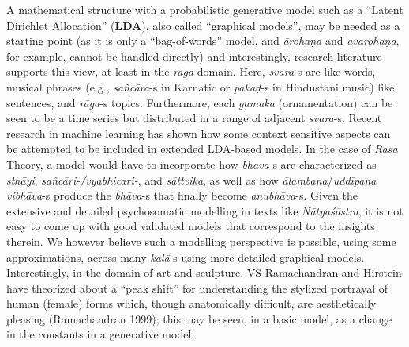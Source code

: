 A mathematical structure with a probabilistic generative model such as a “Latent Dirichlet Allocation” (\textbf{LDA}), also called “graphical models”, may be needed as a starting point (as it is only a “bag-of-words” model, and \textsl{ārohaṇa} and \textsl{avarohaṇa}, for example, cannot be handled directly) and interestingly, research literature supports this view, at least in the \textsl{rāga} domain. Here, \textsl{svara}-s are like words, musical phrases (e.g., \textsl{sañcāra}-s in Karnatic or \textsl{pakaḍ}-s in Hindustani music) like sentences, and \textsl{rāga}-s topics. Furthermore, each \textsl{gamaka} (ornamentation) can be seen to be a time series but distributed in a range of adjacent \hbox{\textsl{svara}-s}. Recent research in machine learning has shown how some context sensitive aspects can be attempted to be included in extended LDA-based models. In the case of \textsl{Rasa} Theory, a model would have to incorporate how \textsl{bhava}-s are characterized as \textsl{sthāyi}, \textsl{sañcāri-/vyabhicari-}, and \textsl{sāttvika}, as well as how \textsl{ālambana}/\textsl{uddīpana vibhāva}-s produce the \textsl{bhāva}-s that finally become \textsl{anubhāva}-s.
 Given the extensive and detailed psychosomatic modelling in texts like \textsl{Nāṭyaśāstra}, it is not easy to come up with good validated models that correspond to the insights therein. We however believe such a modelling perspective is possible, using some approximations, across many \textsl{kalā}-s using more detailed graphical models. Interestingly, in the domain of art and sculpture, VS Ramachandran and Hirstein have theorized about a “peak shift” for understanding the stylized portrayal of human (female) forms which, though anatomically difficult, are aesthetically pleasing (Ramachandran 1999); this may be seen, in a basic model, as a change in the constants in a generative model.


